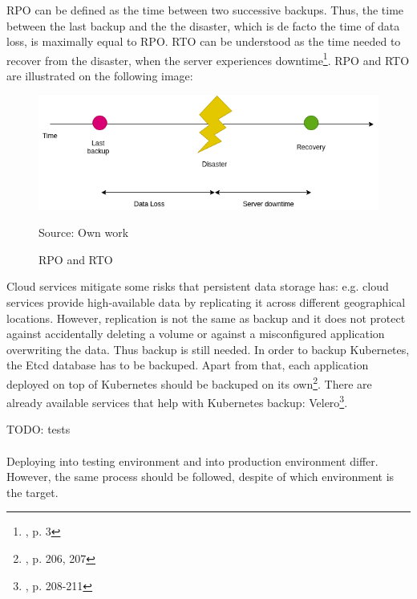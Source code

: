 RPO can be defined as the time between two successive backups. Thus, the time between the last backup and the the disaster, which is de facto the time of data loss, is maximally equal to RPO. RTO can be understood as the time needed to recover from the disaster, when the server experiences downtime\footnote{\cite{article-dr-cloud}, p. 3}. RPO and RTO are illustrated on the following image:
\begin{figure}[H]
    \centering
    \includegraphics[width=13cm]{figures/rpo-rto.png}
    \label{fig:rpo-rto}
    \caption{RPO and RTO}
    \small{Source: Own work}
\end{figure}

Cloud services mitigate some risks that persistent data storage has: e.g. cloud services provide high-available data by replicating it across different geographical locations. However, replication is not the same as backup and it does not protect against accidentally deleting a volume or against a misconfigured application overwriting the data. Thus backup is still needed. In order to backup Kubernetes, the Etcd database has to be backuped. Apart from that, each application deployed on top of Kubernetes should be backuped on its own\footnote{\cite{book-cndwk}, p. 206, 207}. There are already available services that help with Kubernetes backup: Velero\footnote{\cite{book-cndwk}, p. 208-211}.

TODO: tests
\paragraph{}
Deploying into testing environment and into production environment differ. However, the same process should be followed, despite of which environment is the target.
